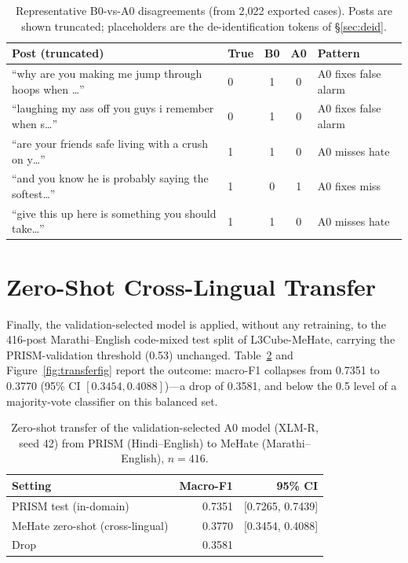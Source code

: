 \begin{table}[htbp]
\centering
\caption[Representative B0-vs-A0 disagreements]{Representative B0-vs-A0 disagreements (from 2{,}022 exported cases).
Posts are shown truncated; placeholders are the de-identification tokens of
\S\ref{sec:deid}.}
\label{tab:qualitative}
\scriptsize
\begin{tabular}{p{5.3cm}lccp{1.6cm}}
\toprule
Post (truncated) & True & B0 & A0 & Pattern \\
\midrule
``why are you making me jump through hoops when \ldots'' & 0 & 1 & 0 & A0 fixes false alarm \\
``laughing my ass off you guys i remember when s\ldots'' & 0 & 1 & 0 & A0 fixes false alarm \\
``are your friends safe living with a crush on y\ldots'' & 1 & 1 & 0 & A0 misses hate \\
``and you know he is probably saying the softest\ldots'' & 1 & 0 & 1 & A0 fixes miss \\
``give this up here is something you should take\ldots'' & 1 & 1 & 0 & A0 misses hate \\
\bottomrule
\end{tabular}
\end{table}

\section{Zero-Shot Cross-Lingual Transfer}
\label{sec:transfer}

Finally, the validation-selected model is applied, without any retraining, to the
416-post Marathi--English code-mixed test split of L3Cube-MeHate, carrying the
PRISM-validation threshold (0.53) unchanged. Table~\ref{tab:transfer} and
Figure~\ref{fig:transferfig} report the outcome: macro-F1 collapses from 0.7351
to 0.3770 (95\% CI $[0.3454, 0.4088]$)---a drop of 0.3581, and below the 0.5
level of a majority-vote classifier on this balanced set.

\begin{table}[htbp]
\centering
\caption[Zero-shot transfer from PRISM to MeHate]{Zero-shot transfer of the validation-selected A0 model (XLM-R, seed 42)
from PRISM (Hindi--English) to MeHate (Marathi--English), $n = 416$.}
\label{tab:transfer}
\small
\begin{tabular}{lrr}
\toprule
Setting & Macro-F1 & 95\% CI \\
\midrule
PRISM test (in-domain) & 0.7351 & [0.7265, 0.7439] \\
MeHate zero-shot (cross-lingual) & 0.3770 & [0.3454, 0.4088] \\
\midrule
Drop & 0.3581 & \\
\bottomrule
\end{tabular}
\end{table}

